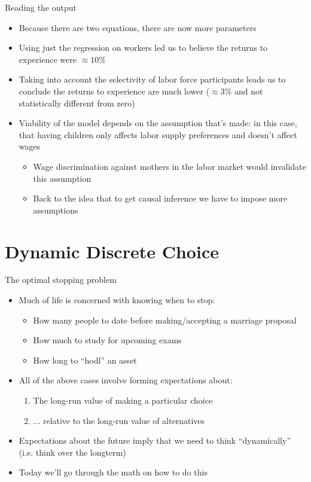 \documentclass[english,aspectratio=169,12pt,xcolor=dvipsnames]{beamer}
\begin{document}
\begin{frame}{Reading the output}
\begin{itemize}
    \item Because there are two equations, there are now more parameters
    \item Using just the regression on workers led us to believe the returns to experience were $\approx 10\%$
    \item Taking into account the selectivity of labor force participants leads us to conclude the returns to experience are much lower ($\approx 3\%$ and not statistically different from zero)
    \item Viability of the model depends on the assumption that's made: in this case, that having children only affects labor supply preferences and doesn't affect wages
    \begin{itemize}
        \item Wage discrimination against mothers in the labor market would invalidate this assumption
        \item Back to the idea that to get causal inference we have to impose more assumptions
    \end{itemize}
\end{itemize}
\end{frame}



\section{Dynamic Discrete Choice}
\begin{frame}{The optimal stopping problem}
\begin{itemize}
\item Much of life is concerned with knowing when to stop:
    \begin{itemize}
    \item How many people to date before making/accepting a marriage proposal
    \item How much to study for upcoming exams
    \item How long to ``hodl'' an asset
    \end{itemize}
\item All of the above cases involve forming expectations about:
    \begin{enumerate}
    \item The long-run value of making a particular choice
    \item ... relative to the long-run value of alternatives
    \end{enumerate}
\item Expectations about the future imply that we need to think ``dynamically'' (i.e. think over the longterm)
\item Today we'll go through the math on how to do this
\end{itemize}
\end{frame}
\end{document}
